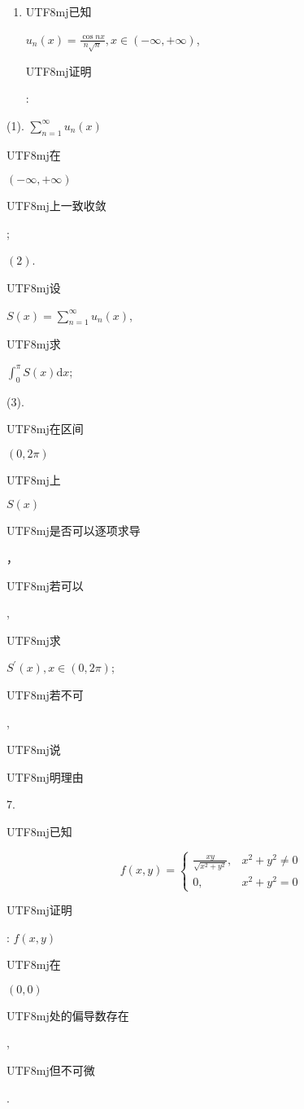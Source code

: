 \documentclass[10pt]{article}
\begin{document}
\begin{enumerate}
  \item \begin{CJK}{UTF8}{mj}已知\end{CJK} $u_{n}(x)=\frac{\cos n x}{n \sqrt{n}}, x \in(-\infty,+\infty)$, \begin{CJK}{UTF8}{mj}证明\end{CJK}:

\end{enumerate}
(1). $\sum_{n=1}^{\infty} u_{n}(x)$ \begin{CJK}{UTF8}{mj}在\end{CJK} $(-\infty,+\infty)$ \begin{CJK}{UTF8}{mj}上一致收敛\end{CJK};

$(2)$. \begin{CJK}{UTF8}{mj}设\end{CJK} $S(x)=\sum_{n=1}^{\infty} u_{n}(x)$, \begin{CJK}{UTF8}{mj}求\end{CJK} $\int_{0}^{\pi} S(x) \mathrm{d} x$;

(3). \begin{CJK}{UTF8}{mj}在区间\end{CJK} $(0,2 \pi)$ \begin{CJK}{UTF8}{mj}上\end{CJK} $S(x)$ \begin{CJK}{UTF8}{mj}是否可以逐项求导\end{CJK}，\begin{CJK}{UTF8}{mj}若可以\end{CJK}, \begin{CJK}{UTF8}{mj}求\end{CJK} $S^{\prime}(x), x \in(0,2 \pi)$; \begin{CJK}{UTF8}{mj}若不可\end{CJK}, \begin{CJK}{UTF8}{mj}说\end{CJK} \begin{CJK}{UTF8}{mj}明理由\end{CJK} 7. \begin{CJK}{UTF8}{mj}已知\end{CJK}
$$
f(x, y)= \begin{cases}\frac{x y}{\sqrt{x^{2}+y^{2}}}, & x^{2}+y^{2} \neq 0 \\ 0, & x^{2}+y^{2}=0\end{cases}
$$
\begin{CJK}{UTF8}{mj}证明\end{CJK}: $f(x, y)$ \begin{CJK}{UTF8}{mj}在\end{CJK} $(0,0)$ \begin{CJK}{UTF8}{mj}处的偏导数存在\end{CJK}, \begin{CJK}{UTF8}{mj}但不可微\end{CJK}.
\end{document}

